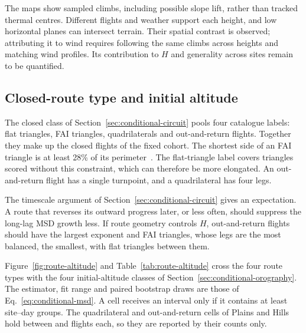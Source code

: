 The maps show sampled climbs, including possible slope lift, rather than
tracked thermal centres. Different flights and weather support each height,
and low horizontal planes can intersect terrain. Their spatial contrast is
observed; attributing it to wind requires following the same climbs across
heights and matching wind profiles. Its contribution to $H$ and generality
across sites remain to be quantified.
\FloatBarrier
\subsection{Closed-route type and initial altitude}
\label{sec:conditional-route}

The closed class of Section~\ref{sec:conditional-circuit} pools four catalogue
labels: flat triangles, FAI triangles, quadrilaterals and out-and-return flights.
Together they make up the \ChThreeMainClosed{} closed flights of the fixed
cohort. The shortest side of an FAI triangle is at least 28\% of its
perimeter~\cite{ffvl_cfd_rules}. The flat-triangle label covers triangles scored
without this constraint, which can therefore be more elongated. An
out-and-return flight has a single turnpoint, and a quadrilateral has four legs.

The timescale argument of Section~\ref{sec:conditional-circuit} gives an
expectation. A route that reverses its outward progress later, or less often,
should suppress the long-lag MSD growth less. If route geometry controls $H$,
out-and-return flights should have the largest exponent and FAI triangles,
whose legs are the most balanced, the smallest, with flat triangles between
them.

Figure~\ref{fig:route-altitude} and Table~\ref{tab:route-altitude} cross the four
route types with the four initial-altitude classes of
Section~\ref{sec:conditional-orography}. The estimator, fit range and paired
bootstrap draws are those of Eq.~\eqref{eq:conditional-msd}. A cell receives an
interval only if it contains at least \RouteMinGroups{} site--day groups. The
quadrilateral and out-and-return cells of Plains and Hills hold between
\RouteOutAndReturnAltZeroN{} and \RouteQuadrilateralAltOneN{} flights each, so
they are reported by their counts only.

